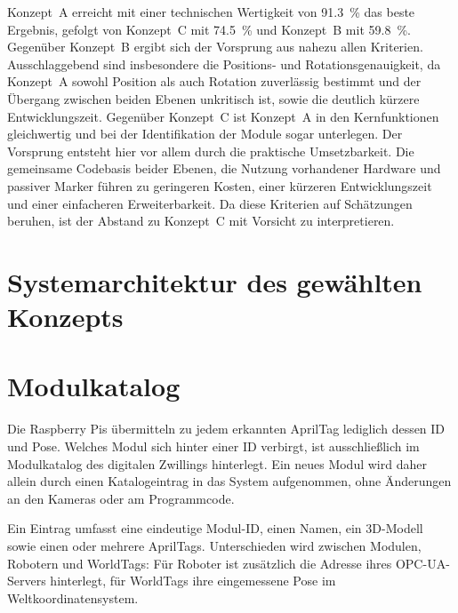 Konzept~A erreicht mit einer technischen Wertigkeit von \SI{91,3}{\percent} das beste Ergebnis, gefolgt von Konzept~C mit \SI{74,5}{\percent} und Konzept~B mit \SI{59,8}{\percent}. Gegenüber Konzept~B ergibt sich der Vorsprung aus nahezu allen Kriterien. Ausschlaggebend sind insbesondere die Positions- und Rotationsgenauigkeit, da Konzept~A sowohl Position als auch Rotation zuverlässig bestimmt und der Übergang zwischen beiden Ebenen unkritisch ist, sowie die deutlich kürzere Entwicklungszeit. Gegenüber Konzept~C ist Konzept~A in den Kernfunktionen gleichwertig und bei der Identifikation der Module sogar unterlegen. Der Vorsprung entsteht hier vor allem durch die praktische Umsetzbarkeit. Die gemeinsame Codebasis beider Ebenen, die Nutzung vorhandener Hardware und passiver Marker führen zu geringeren Kosten, einer kürzeren Entwicklungszeit und einer einfacheren Erweiterbarkeit. Da diese Kriterien auf Schätzungen beruhen, ist der Abstand zu Konzept~C mit Vorsicht zu interpretieren.




\section{Systemarchitektur des gewählten Konzepts}
\label{sec:Systemarchitektur des gewählten Konzepts}

\section{Modulkatalog}
\label{sec:Modulkatalog}
Die Raspberry Pis übermitteln zu jedem erkannten AprilTag lediglich dessen ID und Pose. Welches Modul sich hinter einer ID verbirgt, ist ausschließlich im Modulkatalog des digitalen Zwillings hinterlegt. Ein neues Modul wird daher allein durch einen Katalogeintrag in das System aufgenommen, ohne Änderungen an den Kameras oder am Programmcode.

Ein Eintrag umfasst eine eindeutige Modul-ID, einen Namen, ein 3D-Modell sowie einen oder mehrere AprilTags. Unterschieden wird zwischen Modulen, Robotern und WorldTags: Für Roboter ist zusätzlich die Adresse ihres OPC-UA-Servers hinterlegt, für WorldTags ihre eingemessene Pose im Weltkoordinatensystem.

